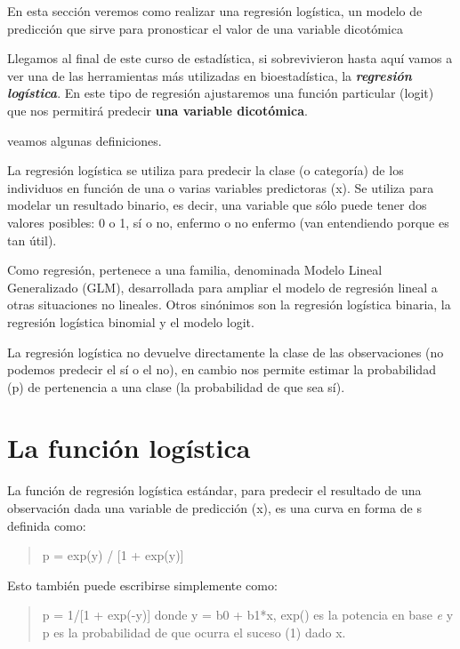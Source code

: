 \documentclass[
]{book}
\begin{document}
En esta sección veremos como realizar una regresión logística, un modelo de predicción que sirve para pronosticar el valor de una variable dicotómica

Llegamos al final de este curso de estadística, si sobrevivieron hasta aquí vamos a ver una de las herramientas más utilizadas en bioestadística, la \textbf{\emph{regresión logística}}. En este tipo de regresión ajustaremos una función particular (logit) que nos permitirá predecir \textbf{una variable dicotómica}.

veamos algunas definiciones.

La regresión logística se utiliza para predecir la clase (o categoría) de los individuos en función de una o varias variables predictoras (x). Se utiliza para modelar un resultado binario, es decir, una variable que sólo puede tener dos valores posibles: 0 o 1, sí o no, enfermo o no enfermo (van entendiendo porque es tan útil).

Como regresión, pertenece a una familia, denominada Modelo Lineal Generalizado (GLM), desarrollada para ampliar el modelo de regresión lineal a otras situaciones no lineales. Otros sinónimos son la regresión logística binaria, la regresión logística binomial y el modelo logit.

La regresión logística no devuelve directamente la clase de las observaciones (no podemos predecir el sí o el no), en cambio nos permite estimar la probabilidad (p) de pertenencia a una clase (la probabilidad de que sea sí).

\hypertarget{la-funciuxf3n-loguxedstica}{%
\section{La función logística}\label{la-funciuxf3n-loguxedstica}}

La función de regresión logística estándar, para predecir el resultado de una observación dada una variable de predicción (x), es una curva en forma de s definida como:

\begin{quote}
p = exp(y) / {[}1 + exp(y){]}
\end{quote}

Esto también puede escribirse simplemente como:

\begin{quote}
p = 1/{[}1 + exp(-y){]}
donde y = b0 + b1*x, exp() es la potencia en base \emph{e} y p es la probabilidad de que ocurra el suceso (1) dado x.
\end{quote}
\end{document}
